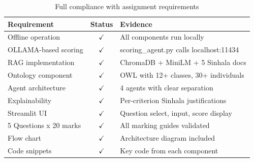 \documentclass[12pt,a4paper]{article}
\begin{document}
\begin{table}[H]
\centering
\begin{tabular}{lcp{7cm}}
\toprule
\textbf{Requirement} & \textbf{Status} & \textbf{Evidence} \\
\midrule
Offline operation & $\checkmark$ & All components run locally \\
OLLAMA-based scoring & $\checkmark$ & scoring\_agent.py calls localhost:11434 \\
RAG implementation & $\checkmark$ & ChromaDB + MiniLM + 5 Sinhala docs \\
Ontology component & $\checkmark$ & OWL with 12+ classes, 30+ individuals \\
Agent architecture & $\checkmark$ & 4 agents with clear separation \\
Explainability & $\checkmark$ & Per-criterion Sinhala justifications \\
Streamlit UI & $\checkmark$ & Question select, input, score display \\
5 Questions x 20 marks & $\checkmark$ & All marking guides validated \\
Flow chart & $\checkmark$ & Architecture diagram included \\
Code snippets & $\checkmark$ & Key code from each component \\
\bottomrule
\end{tabular}
\caption{Full compliance with assignment requirements}
\end{table}
\end{document}
